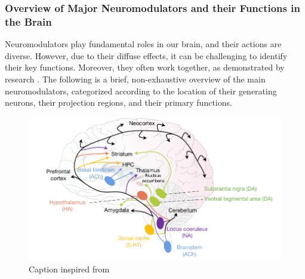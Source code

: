 \subsubsection{Overview of Major Neuromodulators and their Functions in the Brain}
Neuromodulators play fundamental roles in our brain, and their actions are diverse. However, due to their diffuse effects, it can be challenging to identify their key functions. Moreover, they often work together, as demonstrated by research \citep{gu_neuromodulatory_2002, avery_neuromodulatory_2017, nadim_neuromodulation_2014}. The following is a brief, non-exhaustive overview of the main neuromodulators, categorized according to the location of their generating neurons, their projection regions, and their primary functions.

\begin{figure}[h!]
    \centering
    \includegraphics{latex/fig/Intro/Bgd_NMOD.pdf}
    \caption{Caption inspired from \citep{bear_neuroscience_2016, mei_informing_2022}}
    \label{fig:Bgd_NMOD}
\end{figure}

